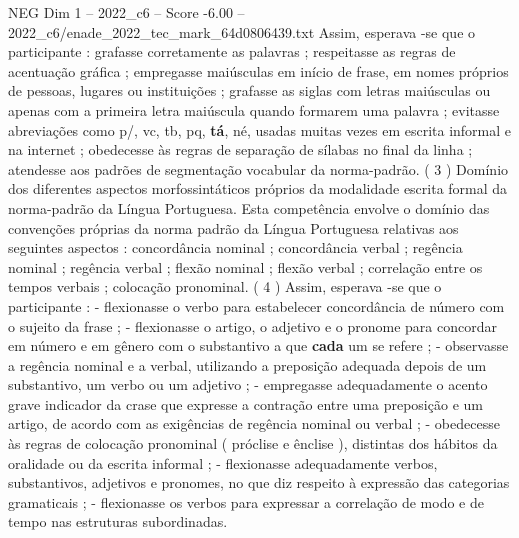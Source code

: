 \begin{textsample}{NEG Dim 1 – 2022\_c6 – Score -6.00 – 2022\_c6/enade\_2022\_tec\_mark\_64d0806439.txt}
Assim, esperava -se que o participante : grafasse corretamente as palavras ; respeitasse as regras de acentuação gráfica ; empregasse maiúsculas em início de frase, em nomes próprios de pessoas, lugares ou instituições ; grafasse as siglas com letras maiúsculas ou apenas com a primeira letra maiúscula quando formarem uma palavra ; evitasse abreviações como p/, vc, tb, pq, \textbf{tá}, né, usadas muitas vezes em escrita informal e na internet ; obedecesse às regras de separação de sílabas no final da linha ; atendesse aos padrões de segmentação vocabular da norma-padrão. ( 3 ) Domínio dos diferentes aspectos morfossintáticos próprios da modalidade escrita formal da norma-padrão da Língua Portuguesa.
Esta competência envolve o domínio das convenções próprias da norma padrão da Língua Portuguesa relativas aos seguintes aspectos : concordância nominal ; concordância verbal ; regência nominal ; regência verbal ; flexão nominal ; flexão verbal ; correlação entre os tempos verbais ; colocação pronominal. ( 4 ) Assim, esperava -se que o participante : - flexionasse o verbo para estabelecer concordância de número com o sujeito da frase ; - flexionasse o artigo, o adjetivo e o pronome para concordar em número e em gênero com o substantivo a que \textbf{cada} um se refere ; - observasse a regência nominal e a verbal, utilizando a preposição adequada depois de um substantivo, um verbo ou um adjetivo ; - empregasse adequadamente o acento grave indicador da crase que expresse a contração entre uma preposição e um artigo, de acordo com as exigências de regência nominal ou verbal ; - obedecesse às regras de colocação pronominal ( próclise e ênclise ), distintas dos hábitos da oralidade ou da escrita informal ; - flexionasse adequadamente verbos, substantivos, adjetivos e pronomes, no que diz respeito à expressão das categorias gramaticais ; - flexionasse os verbos para expressar a correlação de modo e de tempo nas estruturas subordinadas.

\end{textsample}
